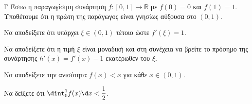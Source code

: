 \begin{thema}{Γ}
Έστω η παραγωγίσιμη συνάρτηση $f: [0, 1] \to \mathbb{R}$ με $f(0) = 0$ και $f(1) = 1$. Υποθέτουμε ότι η πρώτη της παράγωγος είναι γνησίως αύξουσα στο $(0,1)$.
\begin{erwthma}
  \item Να αποδείξετε ότι υπάρχει $\xi \in (0, 1)$ τέτοιο ώστε $f'(\xi) = 1$.
  \item Να αποδείξετε ότι η τιμή $\xi$ είναι μοναδική και στη συνέχεια να βρείτε το πρόσημο της συνάρτησης $h'(x) = f'(x) - 1$ εκατέρωθεν του $\xi$.
  \item Να αποδείξετε την ανισότητα $f(x) < x$ για κάθε $x \in (0, 1)$.
  \item Να δείξετε ότι $\dint_0^1 f(x)\d x < \dfrac{1}{2}$.
\end{erwthma}
\end{thema}
